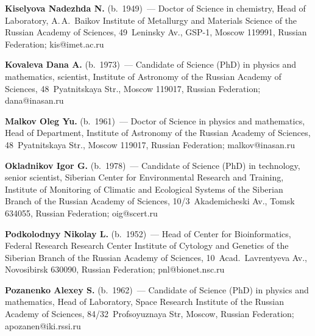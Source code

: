 \vspace*{3pt}

\noindent
       \textbf{Kiselyova Nadezhda N.} (b.\ 1949)~--- Doctor of Science in chemistry, Head of 
Laboratory, A.\,A.~Baikov Institute of Metallurgy and Materials Science of the Russian 
Academy of Sciences,  49~Leninsky Av., GSP-1, Moscow 119991, Russian Federation; 
kis@imet.ac.ru
       
\vspace*{3pt}

\noindent
       \textbf{Kovaleva Dana A.} (b.\ 1973)~--- Candidate of Science (PhD) in physics and 
mathematics, scientist, Institute of Astronomy of the Russian Academy of Sciences, 
48~Pyatnitskaya Str., Moscow 119017, Russian Federation; dana@inasan.ru
       
\vspace*{3pt}

\noindent
       \textbf{Malkov Oleg Yu.} (b.\ 1961)~--- Doctor of Science in physics and mathematics, 
Head of Department, Institute of Astronomy of the Russian Academy of Sciences, 
48~Pyatnitskaya Str., Moscow 119017, Russian Federation; malkov@inasan.ru
       
\vspace*{3pt}

\noindent
       \textbf{Okladnikov Igor G.} (b.\ 1978)~--- Candidate of Science (PhD) in technology, 
senior scientist, Siberian Center for Environmental Research and Training, Institute of 
Monitoring of Climatic and Ecological Systems of the Siberian Branch of the Russian Academy 
of Sciences, 10/3~Akademicheski Av., 
Tomsk 634055, Russian Federation; oig@scert.ru
       
\pagebreak

\noindent
       \textbf{Podkolodnyy Nikolay L.} (b.\ 1952)~--- Head of Center for Bioinformatics, 
Federal Research Research Center Institute of Cytology and Genetics 
of the Siberian Branch of 
the Russian Academy of Sciences, 10~Acad.\ Lavrentyeva Av., Novosibirsk 630090, 
Russian Federation; pnl@bionet.nsc.ru
       
\vspace*{3pt}

\noindent
       \textbf{Pozanenko Alexey S.} (b.\ 1962)~--- Candidate of Science (PhD) in physics and 
mathematics, Head of Laboratory, Space Research Institute of the Russian Academy of Sciences, 
84/32~Profsoyuznaya Str, Moscow, Russian Federation; apozanen@iki.rssi.ru
       
\vspace*{3pt}

